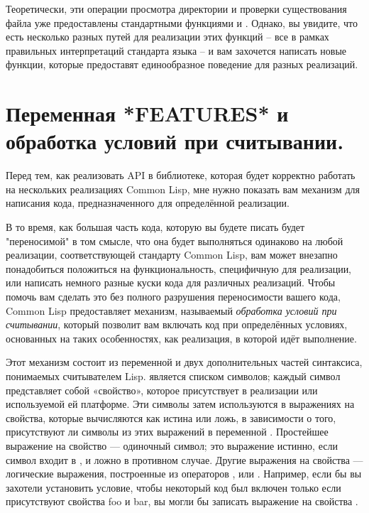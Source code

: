 Теоретически, эти операции просмотра директории и проверки существования файла уже
предоставлены стандартными функциями  и . Однако, вы
увидите, что есть несколько разных путей для реализации этих функций -- все в рамках
правильных интерпретаций стандарта языка -- и вам захочется написать новые функции,
которые предоставят единообразное поведение для разных реализаций.

\section{Переменная *FEATURES* и обработка условий при считывании.}

Перед тем, как реализовать API в библиотеке, которая будет корректно работать на
нескольких реализациях Common Lisp, мне нужно показать вам механизм для написания кода,
предназначенного для определённой реализации.

В то время, как большая часть кода, которую вы будете писать будет "переносимой" в том
смысле, что она будет выполняться одинаково на любой реализации, соответствующей стандарту
Common Lisp, вам может внезапно понадобиться положиться на функциональность, специфичную
для реализации, или написать немного разные куски кода для различных реализаций. Чтобы
помочь вам сделать это без полного разрушения переносимости вашего кода, Common Lisp
предоставляет механизм, называемый \textit{обработка условий при считывании}, который
позволит вам включать код при определённых условиях, основанных на таких особенностях, как
реализация, в которой идёт выполнение.

Этот механизм состоит из переменной  и двух дополнительных частей
синтаксиса, понимаемых считывателем Lisp.  является списком символов;
каждый символ представляет собой «свойство», которое присутствует в реализации или
используемой ей платформе. Эти символы затем используются в выражениях на свойства,
которые вычисляются как истина или ложь, в зависимости о того, присутствуют ли символы из
этих выражений в переменной . Простейшее выражение на свойство ---
одиночный символ; это выражение истинно, если символ входит в , и ложно в
противном случае. Другие выражения на свойства --- логические выражения, построенные из
операторов ,  или . Например, если бы вы захотели установить
условие, чтобы некоторый код был включен только если присутствуют свойства foo и bar, вы
могли бы записать выражение на свойства .

